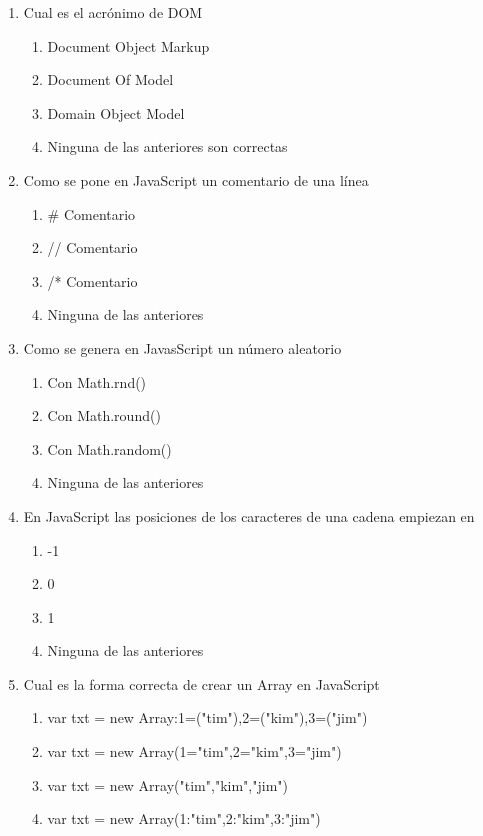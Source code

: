 \documentclass[addpoints, 12]{exam}
\begin{document}
\begin{enumerate}
\item Cual es el acrónimo de DOM

\begin{enumerate}
\item Document Object Markup
\item Document Of Model
\item Domain Object Model
\item Ninguna de las anteriores son correctas
\end{enumerate}

\item Como se pone en JavaScript un comentario de una línea

\begin{enumerate}
\item \# Comentario
\item // Comentario
\item /* Comentario
\item Ninguna de las anteriores
\end{enumerate}

\item Como se genera en JavasScript un número aleatorio 

\begin{enumerate}
\item Con Math.rnd()
\item Con Math.round()
\item Con Math.random()
\item Ninguna de las anteriores
\end{enumerate}

\item En JavaScript las posiciones de los caracteres de una cadena empiezan en 

\begin{enumerate}
\item -1
\item 0
\item 1
\item Ninguna de las anteriores
\end{enumerate}

\item Cual es la forma correcta de crear un Array en JavaScript

\begin{enumerate}
\item var txt = new Array:1=("tim"),2=("kim"),3=("jim")
\item var txt = new Array(1="tim",2="kim",3="jim")
\item var txt = new Array("tim","kim","jim")
\item var txt = new Array(1:"tim",2:"kim",3:"jim")
\end{enumerate}


\end{enumerate}
\end{document}
